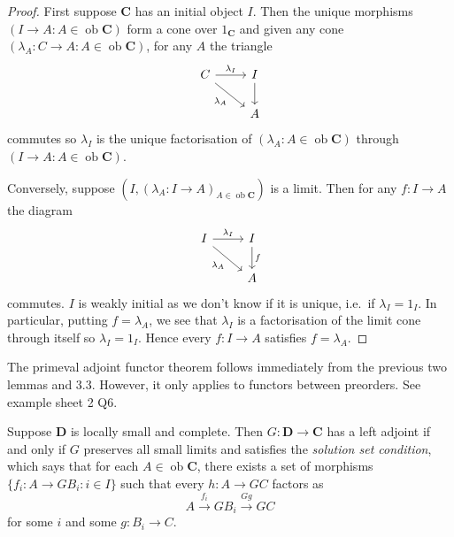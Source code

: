 \documentclass[a4paper]{article}
\renewcommand{\c}[1]{\mathbf{#1}}
\DeclareMathOperator{\ob}{ob}
\begin{document}
\begin{proof}
  First suppose \(\c C\) has an initial object \(I\). Then the unique morphisms \((I \to A: A \in \ob \c C)\) form a cone over \(1_{\c C}\) and given any cone \((\lambda_A: C \to A: A \in \ob \c C)\), for any \(A\) the triangle
  \[
    \begin{tikzcd}
      C \ar[r, "\lambda_I"] \ar[dr, "\lambda_A"'] & I \ar[d] \\
      & A
    \end{tikzcd}
  \]
  commutes so \(\lambda_I\) is the unique factorisation of \((\lambda_A: A \in \ob \c C)\) through \((I \to A: A \in \ob \c C)\).

  Conversely, suppose \((I, (\lambda_A: I \to A)_{A \in \ob \c C})\) is a limit. Then for any \(f: I \to A\) the diagram
  \[
    \begin{tikzcd}
      I \ar[r, "\lambda_I"] \ar[dr, "\lambda_A"'] & I \ar[d, "f"] \\
      & A
    \end{tikzcd}
  \]
  commutes. \(I\) is weakly initial as we don't know if it is unique, i.e.\ if \(\lambda_I = 1_I\). In particular, putting \(f = \lambda_A\), we see that \(\lambda_I\) is a factorisation of the limit cone through itself so \(\lambda_I = 1_I\). Hence every \(f: I \to A\) satisfies \(f = \lambda_A\).
\end{proof}

The primeval adjoint functor theorem follows immediately from the previous two lemmas and 3.3. However, it only applies to functors between preorders. See example sheet 2 Q6.

\begin{theorem}
  Suppose \(\c D\) is locally small and complete. Then \(G: \c D \to \c C\) has a left adjoint if and only if \(G\) preserves all small limits and satisfies the \emph{solution set condition}, which says that for each \(A \in \ob \c C\), there exists a set of morphisms \(\{f_i: A \to GB_i: i \in I\}\) such that every \(h: A \to GC\) factors as
  \[
    A \xrightarrow{f_i} GB_i \xrightarrow{Gg} GC
  \]
  for some \(i\) and some \(g: B_i \to C\).
\end{theorem}
\end{document}
